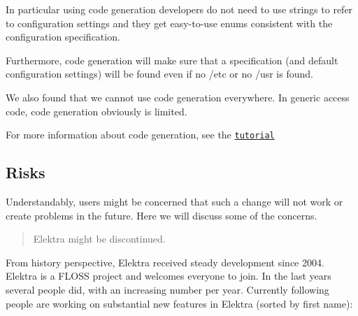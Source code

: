 In particular using code generation developers do not need to use strings to refer to configuration settings and they get easy-\/to-\/use enums consistent with the configuration specification.

Furthermore, code generation will make sure that a specification (and default configuration settings) will be found even if no {\ttfamily /etc} or no {\ttfamily /usr} is found.

We also found that we cannot use code generation everywhere. In generic access code, code generation obviously is limited.


\begin{DoxyItemize}
\item For more information about code generation, see the \href{https://www.libelektra.org/tools/gen}{\tt tutorial}
\end{DoxyItemize}

\subsection*{Risks}

Understandably, users might be concerned that such a change will not work or create problems in the future. Here we will discuss some of the concerns.

\begin{quote}
Elektra might be discontinued. \end{quote}


From history perspective, Elektra received steady development since 2004. Elektra is a F\+L\+O\+SS project and welcomes everyone to join. In the last years several people did, with an increasing number per year. Currently following people are working on substantial new features in Elektra (sorted by first name)\+:


